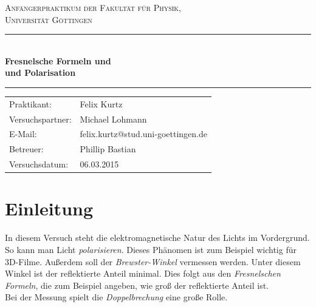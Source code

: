 \documentclass[12pt,a4paper,titlepage,headinclude,bibtotoc]{scrartcl}
\begin{document}
\begin{titlepage}
\centering
\textsc{\Large Anfängerpraktikum der Fakultät für
  Physik,\\[1.5ex] Universität Göttingen}

\vspace*{4.2cm}

\rule{\textwidth}{1pt}\\[0.5cm]
{\huge \bfseries
  Fresnelsche Formeln und\\[1.5ex]
  und Polarisation}\\[0.5cm]
\rule{\textwidth}{1pt}

\vspace*{3.0cm}

\begin{Large}
\begin{tabular}{ll}
Praktikant:
 	&  Felix Kurtz\\
Versuchspartner:
 	&  Michael Lohmann\\

E-Mail: 
	&  felix.kurtz@stud.uni-goettingen.de\\
	
 Betreuer: & Phillip Bastian\\
 Versuchsdatum: &  06.03.2015\\
\end{tabular}
\end{Large}

\vspace*{1.8cm}

\begin{Large}
\end{Large}

\end{titlepage}

\tableofcontents

\newpage

\section{Einleitung}
\label{sec:einleitung}
In diesem Versuch steht die elektromagnetische Natur des Lichts im Vordergrund.
So kann man Licht \emph{polarisieren}.
Dieses Phänomen ist zum Beispiel wichtig für 3D-Filme.
Außerdem soll der \emph{Brewster-Winkel} vermessen werden.
Unter diesem Winkel ist der reflektierte Anteil minimal.
Dies folgt aus den \emph{Fresnelschen Formeln}, die zum Beispiel angeben, wie groß der reflektierte Anteil ist.\\
Bei der Messung spielt die \emph{Doppelbrechung} eine große Rolle.
\end{document}
